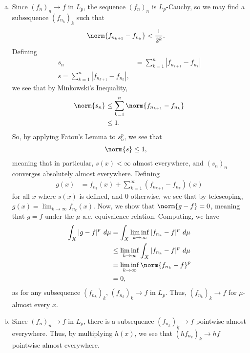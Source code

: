 \documentclass[10pt]{mypackage}
\begin{document}
\begin{enumerate}[(a)]
  \item Since $\left( f_n \right)_n\rightarrow f$ in $L_p$, the sequence $\left( f_n \right)_n$ is $L_p$-Cauchy, so we may find a subsequence $\left( f_{n_k} \right)_k$ such that
    \begin{align*}
      \norm{f_{n_{k+1}} - f_{n_k}} &< \frac{1}{2^{k}}.
    \end{align*}
    Defining
    \begin{align*}
      s_n &= \sum_{k=1}^{n} \left\vert f_{n_{k+1}} - f_{n_k} \right\vert\\
      s = \sum_{k=1}^{n} \left\vert f_{n_{k+1}} -f_{n_{k}} \right\vert,
    \end{align*}
    we see that by Minkowski's Inequality,
    \begin{align*}
      \norm{s_n} &\leq \sum_{k=1}^{n} \norm{f_{n_{k+1}} - f_{n_k}}\\
                 &\leq 1.
    \end{align*}
    So, by applying Fatou's Lemma to $s_{n}^p$, we see that
    \begin{align*}
      \norm{s} &\leq 1,
    \end{align*}
    meaning that in particular, $s(x) < \infty$ almost everywhere, and $\left( s_n \right)_n$ converges absolutely almost everywhere. Defining
    \begin{align*}
      g(x) &= f_{n_1}(x) + \sum_{k=1}^{\infty} \left( f_{n_{k+1}} - f_{n_{k}} \right)(x)
    \end{align*}
    for all $x$ where $s(x)$ is defined, and $0$ otherwise, we see that by telescoping, $g(x) = \lim_{k\rightarrow\infty}f_{n_{k}}(x)$. Now, we show that $\norm{g-f} = 0$, meaning that $g = f$ under the $\mu$-a.e. equivalence relation. Computing, we have
    \begin{align*}
      \int_{X}^{} \left\vert g-f \right\vert^{p}\:d\mu &= \int_{X}^{} \liminf_{k\rightarrow\infty}\left\vert f_{n_{k}} - f \right\vert^{p}\:d\mu\\
                                                       &\leq \liminf_{k\rightarrow\infty} \int_{X}^{} \left\vert f_{n_{k}} - f \right\vert^{p}\:d\mu\\
                                                       &= \liminf_{k\rightarrow\infty}\norm{f_{n_{k}} - f}^{p}\\
                                                       &= 0,
    \end{align*}
    as for any subsequence $\left( f_{n_{k}} \right)_{k}$, $\left( f_{n_{k}} \right)_k\rightarrow f$ in $L_p$. Thus, $\left( f_{n_{k}} \right)_{k}\rightarrow f$ for $\mu$-almost every $x$.
  \item Since $\left( f_n \right)_n\rightarrow f$ in $L_p$, there is a subsequence $\left( f_{n_{k}} \right)_k\rightarrow f$ pointwise almost everywhere. Thus, by multiplying $h(x)$, we see that $\left( hf_{n_{k}} \right)_k\rightarrow hf$ pointwise almost everywhere.\newline


\end{enumerate}
\end{document}
